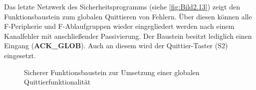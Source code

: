 Das letzte Netzwerk des Sicherheitsprogramms (siehe \autoref{fig:Bild2.13}) zeigt den Funktionsbaustein zum globalen Quittieren von Fehlern. Über diesen können alle F-Peripherie und F-Ablaufgruppen wieder eingegliedert werden nach \zB einem Kanalfehler mit anschließender Passivierung. Der Baustein besitzt lediglich einen Eingang (\textbf{ACK\_GLOB}). Auch an diesem wird der Quittier-Taster (S2) eingesetzt.

\begin{figure}[H]
   \centering
   \caption[FB zum globalen Quittieren]{Sicherer Funktionsbaustein zur Umsetzung einer globalen Quittierfunktionalität}
   \label{fig:Bild2.13}
\end{figure}